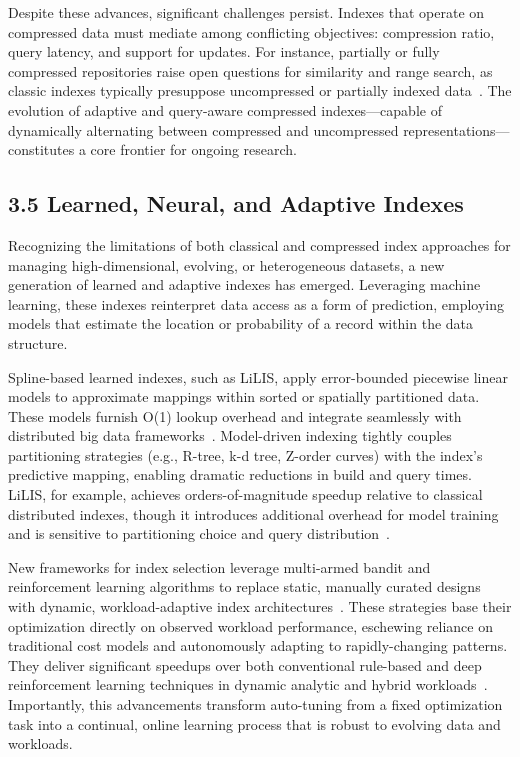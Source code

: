 \documentclass[11pt]{article}
\begin{document}
Despite these advances, significant challenges persist. Indexes that operate on compressed data must mediate among conflicting objectives: compression ratio, query latency, and support for updates. For instance, partially or fully compressed repositories raise open questions for similarity and range search, as classic indexes typically presuppose uncompressed or partially indexed data~\cite{118}. The evolution of adaptive and query-aware compressed indexes—capable of dynamically alternating between compressed and uncompressed representations—constitutes a core frontier for ongoing research.

\subsection{3.5 Learned, Neural, and Adaptive Indexes}

Recognizing the limitations of both classical and compressed index approaches for managing high-dimensional, evolving, or heterogeneous datasets, a new generation of learned and adaptive indexes has emerged. Leveraging machine learning, these indexes reinterpret data access as a form of prediction, employing models that estimate the location or probability of a record within the data structure.

Spline-based learned indexes, such as LiLIS, apply error-bounded piecewise linear models to approximate mappings within sorted or spatially partitioned data. These models furnish O(1) lookup overhead and integrate seamlessly with distributed big data frameworks~\cite{110}. Model-driven indexing tightly couples partitioning strategies (e.g., R-tree, k-d tree, Z-order curves) with the index’s predictive mapping, enabling dramatic reductions in build and query times. LiLIS, for example, achieves orders-of-magnitude speedup relative to classical distributed indexes, though it introduces additional overhead for model training and is sensitive to partitioning choice and query distribution~\cite{110}.

New frameworks for index selection leverage multi-armed bandit and reinforcement learning algorithms to replace static, manually curated designs with dynamic, workload-adaptive index architectures~\cite{105}. These strategies base their optimization directly on observed workload performance, eschewing reliance on traditional cost models and autonomously adapting to rapidly-changing patterns. They deliver significant speedups over both conventional rule-based and deep reinforcement learning techniques in dynamic analytic and hybrid workloads~\cite{105}. Importantly, this advancements transform auto-tuning from a fixed optimization task into a continual, online learning process that is robust to evolving data and workloads.
\end{document}
